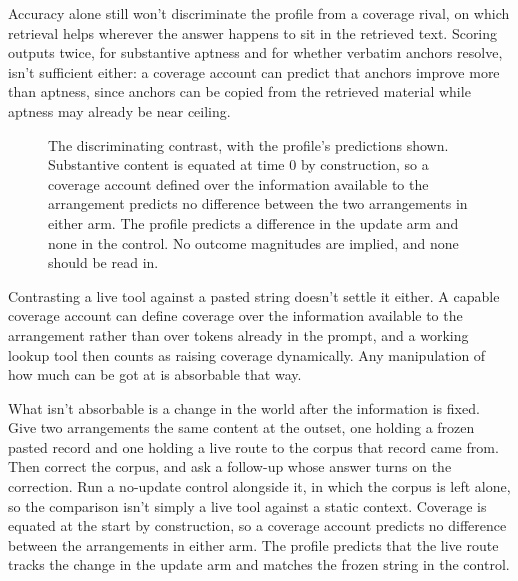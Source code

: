 \documentclass[12pt]{article}
\begin{document}
Accuracy alone still won't discriminate the profile from a coverage rival, on which
retrieval helps wherever the answer happens to sit in the retrieved text. Scoring outputs
twice, for substantive aptness and for whether verbatim anchors resolve, isn't sufficient
either: a coverage account can predict that anchors improve more than aptness, since
anchors can be copied from the retrieved material while aptness may already be near
ceiling. \begin{figure}[tbp]
\centering
{}
\caption{The discriminating contrast, with the profile's predictions shown. Substantive
content is equated at time 0 by construction, so a coverage account defined over the
information available to the arrangement predicts no difference between the two
arrangements in either arm. The profile predicts a difference in the update arm and none in
the control. No outcome magnitudes are implied, and none should be read
in.}\label{fig:design}
\end{figure}

Contrasting a live tool against a pasted string doesn't settle it either. A capable coverage
account can define coverage over the information available to the arrangement rather than
over tokens already in the prompt, and a working lookup tool then counts as raising coverage
dynamically. Any manipulation of how much can be got at is absorbable that way.

What isn't absorbable is a change in the world after the information is fixed. Give two
arrangements the same content at the outset, one holding a frozen pasted record and one
holding a live route to the corpus that record came from. Then correct the corpus, and ask a
follow-up whose answer turns on the correction. Run a no-update control alongside it, in
which the corpus is left alone, so the comparison isn't simply a live tool against a static
context. Coverage is equated at the start by construction, so a coverage account predicts no
difference between the arrangements in either arm. The profile predicts that the live route
tracks the change in the update arm and matches the frozen string in the control.
\end{document}
